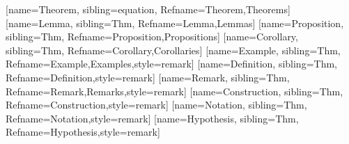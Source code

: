 \newcommand{\nc}{\newcommand}
\DeclareMathOperator{\im}{im}
[name=Theorem, sibling=equation, Refname={Theorem,Theorems}]
[name=Lemma, sibling=Thm, Refname={Lemma,Lemmas}]
[name=Proposition, sibling=Thm, Refname={Proposition,Propositions}]
[name=Corollary, sibling=Thm, Refname={Corollary,Corollaries}]
[name=Example, sibling=Thm, Refname={Example,Examples},style=remark]
[name=Definition, sibling=Thm, Refname={Definition},style=remark]
[name=Remark, sibling=Thm, Refname={Remark,Remarks},style=remark]
[name=Construction, sibling=Thm, Refname={Construction},style=remark]
[name=Notation, sibling=Thm, Refname={Notation},style=remark]
[name=Hypothesis, sibling=Thm, Refname={Hypothesis},style=remark]
\nc{\dmo}{\DeclareMathOperator}
\dmo{\surj}{surj}
\nc{\bbZ}{\mathbb{Z}}
\nc{\bbN}{\mathbb{N}}

\usepackage[
    backend=biber,
    style=alphabetic,
    maxalphanames=4,
    minalphanames=4,
    maxbibnames=5,
    maxcitenames=5,
    backref=true,
    sortlocale=de_DE,
    natbib=true,
    doi=false,
    isbn=false,
    url=false
]{biblatex}

\DeclareMathOperator{\Surj}{Surj}
\DeclareMathOperator{\Pic}{Pic}
\DeclareMathOperator{\Spec}{Spec}
\DeclareMathOperator{\coker}{coker}
\DeclareMathOperator{\Supp}{Supp}
\DeclareMathOperator{\lcm}{lcm}
\DeclareMathOperator{\Epi}{Epi}
\DeclareMathOperator{\Exc}{Exc}
\DeclareMathOperator{\Sp}{Sp}
\DeclareMathOperator{\Hom}{Hom}
\DeclareMathOperator{\Aut}{Aut}
\newcommand{\cO}{\mathcal{O}}
\newcommand{\num}[1]{[#1]}
\makeatletter
\newcommand{\bbQ}{\mathbb{Q}}
\newcommand{\bbS}{\mathbb{S}}
\newcommand{\bbF}{\mathbb{F}}
\newcommand{\pr}{pr}
\newcommand{\gr}{\operatorname{gr}}
\renewcommand*\pod[1]{%
  \allowbreak
  \mathchoice
    {\mkern 18mu}%
    {\mkern  8mu}%
    {\mkern  8mu}%
    {\mkern  8mu}%
  (#1)%
}
\DeclareMathOperator{\Inv}{Inv}
\DeclareMathOperator{\Th}{Th}
\DeclareMathOperator{\Sm}{Sm}
\DeclareMathOperator{\RadId}{RadIdl}
\DeclareMathOperator{\Der}{D}
\DeclareMathOperator{\Idl}{Idl}
\makeatother
\newcommand{\LQ}{\mathop{\mathrm{LQ}}\nolimits}
\usepackage{dsfont}
\newcommand{\unit}{\mathds{1}}
\newcommand{\CAlg}{\operatorname{CAlg}}
\usepackage{bbm}
\DeclareMathOperator{\Mod}{Mod}

\newcommand{\ba}[1]{\mathbb{#1}}
\newcommand{\meet}{\land}
\newcommand{\join}{\lor}
\DeclareMathOperator{\At}{At}
\DeclareMathOperator{\Clop}{Clop}
\newcommand{\R}[1]{\mathfrak{R}(#1)}
\newcommand{\Idem}[1]{\mathrm{IdemIdl}(#1)}
\DeclareMathOperator{\Ult}{Ult}
\newcommand{\ideal}[1]{\mathfrak{J}_{#1}}


